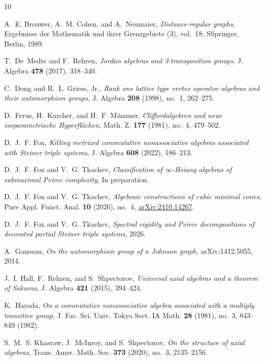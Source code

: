 \documentclass[times,11pt,reqno]{amsproc}
\theoremstyle{definition}
\numberwithin{equation}{section}
\begin{document}
\begin{thebibliography}{10}

A.~E. Brouwer, A.~M. Cohen, and A.~Neumaier, \emph{Distance-regular graphs},
  Ergebnisse der Mathematik und ihrer Grenzgebiete (3), vol.~18, SSpringer,
  Berlin, 1989.

T.~De~Medts and F.~Rehren, \emph{Jordan algebras and 3-transposition groups},
  J. Algebra \textbf{478} (2017), 318--340.

C.~Dong and R.~L. Griess, Jr., \emph{Rank one lattice type vertex operator
  algebras and their automorphism groups}, J. Algebra \textbf{208} (1998),
  no.~1, 262--275.

D.~Ferus, H.~Karcher, and H.~F. M\"unzner, \emph{Cliffordalgebren und neue
  isoparametrische {H}yperfl\"achen}, Math. Z. \textbf{177} (1981), no.~4,
  479--502.

D.~J.~F. Fox, \emph{Killing metrized commutative nonassociative algebras
  associated with {S}teiner triple systems}, J. Algebra \textbf{608} (2022),
  186--213. 

D.~J.~F. Fox and V.~G. Tkachev, \emph{Classification of $\infty$-{Hsiang}
  algebras of submaximal {P}eirce complexity}, In preparation.

D.~J.~F. Fox and V.~G. Tkachev, \emph{Algebraic constructions of cubic minimal cones}, Pure Appl.
  Funct. Anal. \textbf{10} (2026), no.~4,
  \href{https://arxiv.org/abs/2410.14267}{arXiv:2410.14267}.

D.~J.~F. Fox and V.~G. Tkachev, \emph{Spectral rigidity and {P}eirce decompositions of decorated
  partial {S}teiner triple systems}, 2026.

A.~Ganesan, \emph{On the automorphism group of a {J}ohnson graph},
  arXiv:1412.5055, 2014.

J.~I. Hall, F.~Rehren, and S.~Shpectorov, \emph{Universal axial algebras and a
  theorem of {S}akuma}, J. Algebra \textbf{421} (2015), 394--424.

K.~Harada, \emph{On a commutative nonassociative algebra associated with a
  multiply transitive group}, J. Fac. Sci. Univ. Tokyo Sect. IA Math.
  \textbf{28} (1981), no.~3, 843--849 (1982).

S.~M.~S. Khasraw, J.~McInroy, and S.~Shpectorov, \emph{On the structure of
  axial algebras}, Trans. Amer. Math. Soc. \textbf{373} (2020), no.~3,
  2135--2156.


\end{thebibliography}
\end{document}
